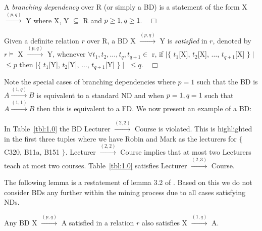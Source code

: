 \begin{definition}
\begin{rm}
A {\em branching dependency} over R (or simply a BD)
is a statement of the form X $\stackrel{(p,q)}{\to}$ Y where X, Y
$\subseteq$ R and $p \ge 1, q \ge 1$.$\quad\Box$
\end{rm}
\end{definition}
\begin{definition}[Satisfaction of a BD]
\begin{rm}
Given a definite relation $r$ over R, 
a BD X $\stackrel{(p,q)}{\to}$ Y is {\em satisfied} in $r$,
denoted by $r \models$ X $\stackrel{(p,q)}{\to}$ Y, whenever
$\forall t_1, t_2, \ldots, t_q, t_{q+1} \in$ r, if 
$\mid \{$ $t_1$[X], $t_2$[X], $\ldots$, $t_{q+1}$[X] $\} \mid$ $\le p$ then 
$\mid \{$ $t_1$[Y], $t_2$[Y], $\ldots$, $t_{q+1}$[Y] $\} \mid$ $\le
q$.$\quad\Box$ 
\end{rm}
\end{definition}


Note the special  cases of branching dependencies
where $p = 1$ such that the BD is  $A 
\stackrel{(1,q)}{\rightarrow} B$
is equivalent to a standard ND and when
$ p = 1, q = 1$ such that  $A \stackrel{(1,1)}{\rightarrow} B$ then
this is equivalent to a FD. We now present an example of a BD:

\begin{example}
\begin{rm} 
In Table~\ref{tbl:1.0} the BD Lecturer $\stackrel{(2,2)}{\to}$ Course
is violated. This is highlighted in the first three tuples where we
have Robin and Mark as the lecturers for $\{$ C320, B11a, B151 $\}$. 
Lecturer $\stackrel{(2,2)}{\to}$ Course implies that at most two
Lecturers teach at most two courses. Table~\ref{tbl:1.0} satisfies 
Lecturer $\stackrel{(2,3)}{\to}$ Course.
\end{rm}
\end{example}

The following lemma is a
restatement of lemma 3.2 of \cite{dks92}. Based on this we do
not consider BDs any further within the mining process due to all
cases satisfying NDs.

\begin{lemma}\label{rev:lem_bd}
\begin{rm}
Any BD X $\stackrel{(p,q)}{\rightarrow}$ A satisfied in a relation $r$
also satisfies X $\stackrel{(1,q)}{\rightarrow}$ A.
\end{rm}
\end{lemma}

